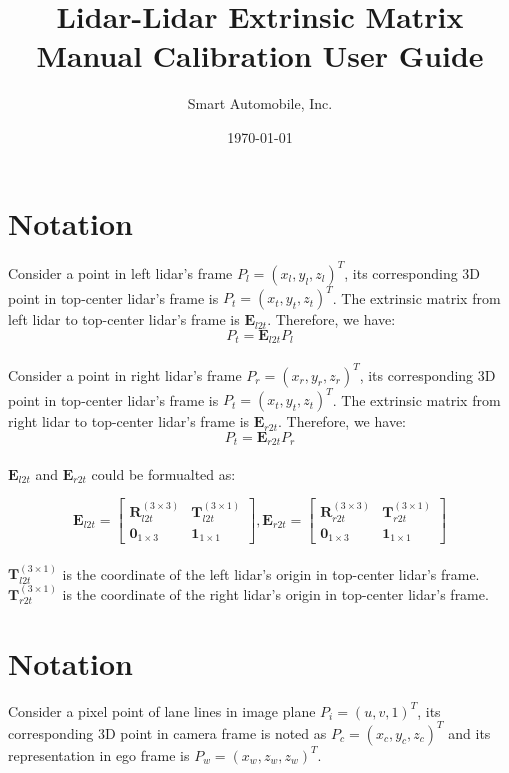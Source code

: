\documentclass[
	letterpaper,
	10pt, 
]{CSUniSchoolLabReport}
\title{Lidar-Lidar Extrinsic Matrix Manual Calibration User Guide}
\author{Smart Automobile, Inc.}
\date{\today}
\begin{document}
\maketitle


\section{Notation}

Consider a point in left lidar's frame $P_l = (x_l, y_l, z_l)^T$, its corresponding 3D point in top-center lidar's frame is $P_t = (x_t, y_t, z_t)^T$. The extrinsic matrix from left lidar to top-center lidar's frame is $\bm{E}_{l2t}$. Therefore, we have:
\begin{equation}
P_t = \bm{E}_{l2t} P_l
\end{equation} \\

Consider a point in right lidar's frame $P_r = (x_r, y_r, z_r)^T$, its corresponding 3D point in top-center lidar's frame is $P_t = (x_t, y_t, z_t)^T$. The extrinsic matrix from right lidar to top-center lidar's frame is $\bm{E}_{r2t}$. Therefore, we have:
\begin{equation}
P_t = \bm{E}_{r2t} P_r
\end{equation} \\


$\bm{E}_{l2t}$ and $\bm{E}_{r2t}$ could be formualted as:

\begin{equation}
\bm{E}_{l2t} = \begin{bmatrix}
\bm{R}_{l2t}^{(3\times 3)} & \bm{T}_{l2t}^{(3\times 1)} \\
\bm{0}_{1\times 3} & \bm{1}_{1 \times 1}
\end{bmatrix},
\bm{E}_{r2t} = \begin{bmatrix}
\bm{R}_{r2t}^{(3\times 3)} & \bm{T}_{r2t}^{(3\times 1)} \\
\bm{0}_{1\times 3} & \bm{1}_{1 \times 1}
\end{bmatrix}
\end{equation} \\

$\bm{T}_{l2t}^{(3\times 1)}$ is the coordinate of the left lidar's origin in top-center lidar's frame.  \\
$\bm{T}_{r2t}^{(3\times 1)}$ is the coordinate of the right lidar's origin in top-center lidar's frame. 



\section{Notation}
Consider a pixel point of lane lines in image plane $P_i = (u, v, 1)^T$, its corresponding 3D point in camera frame is noted as $P_c = (x_c, y_c, z_c)^T$ and its representation in ego frame is $P_w = (x_w, z_w, z_w)^T$. \\
\end{document}
